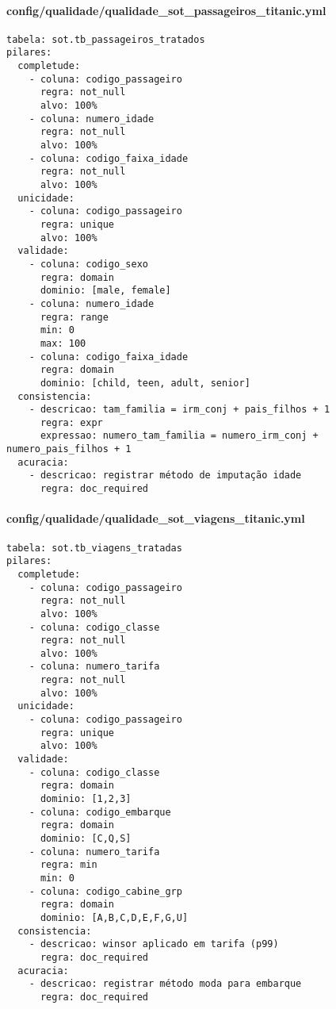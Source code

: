\documentclass[12pt,a4paper]{article}
\begin{document}
\paragraph{config/qualidade/qualidade\_sot\_passageiros\_titanic.yml}
\begin{verbatim}
tabela: sot.tb_passageiros_tratados
pilares:
  completude:
    - coluna: codigo_passageiro
      regra: not_null
      alvo: 100%
    - coluna: numero_idade
      regra: not_null
      alvo: 100%
    - coluna: codigo_faixa_idade
      regra: not_null
      alvo: 100%
  unicidade:
    - coluna: codigo_passageiro
      regra: unique
      alvo: 100%
  validade:
    - coluna: codigo_sexo
      regra: domain
      dominio: [male, female]
    - coluna: numero_idade
      regra: range
      min: 0
      max: 100
    - coluna: codigo_faixa_idade
      regra: domain
      dominio: [child, teen, adult, senior]
  consistencia:
    - descricao: tam_familia = irm_conj + pais_filhos + 1
      regra: expr
      expressao: numero_tam_familia = numero_irm_conj + numero_pais_filhos + 1
  acuracia:
    - descricao: registrar método de imputação idade
      regra: doc_required
\end{verbatim}

\paragraph{config/qualidade/qualidade\_sot\_viagens\_titanic.yml}
\begin{verbatim}
tabela: sot.tb_viagens_tratadas
pilares:
  completude:
    - coluna: codigo_passageiro
      regra: not_null
      alvo: 100%
    - coluna: codigo_classe
      regra: not_null
      alvo: 100%
    - coluna: numero_tarifa
      regra: not_null
      alvo: 100%
  unicidade:
    - coluna: codigo_passageiro
      regra: unique
      alvo: 100%
  validade:
    - coluna: codigo_classe
      regra: domain
      dominio: [1,2,3]
    - coluna: codigo_embarque
      regra: domain
      dominio: [C,Q,S]
    - coluna: numero_tarifa
      regra: min
      min: 0
    - coluna: codigo_cabine_grp
      regra: domain
      dominio: [A,B,C,D,E,F,G,U]
  consistencia:
    - descricao: winsor aplicado em tarifa (p99)
      regra: doc_required
  acuracia:
    - descricao: registrar método moda para embarque
      regra: doc_required
\end{verbatim}
\end{document}

